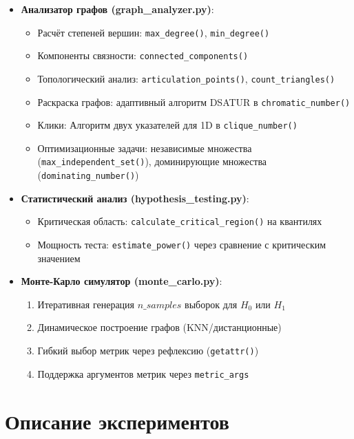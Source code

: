 \documentclass[a4paper, 12pt]{article}
\begin{document}
\begin{itemize}
    \item \textbf{Анализатор графов (graph\_analyzer.py)}:
    \begin{itemize}
            \item Расчёт степеней вершин: \texttt{max\_degree()}, \texttt{min\_degree()}
            \item Компоненты связности: \texttt{connected\_components()}
            \item Топологический анализ: \texttt{articulation\_points()}, \texttt{count\_triangles()}
            \item Раскраска графов: адаптивный алгоритм DSATUR в \texttt{chromatic\_number()}
            \item Клики: Алгоритм двух указателей для 1D в \texttt{clique\_number()}
            \item Оптимизационные задачи: независимые множества (\texttt{max\_independent\_set()}), доминирующие множества (\texttt{dominating\_number()})
        \end{itemize}
    
    \item \textbf{Статистический анализ (hypothesis\_testing.py)}:
    \begin{itemize}
        \item Критическая область: \texttt{calculate\_critical\_region()} на квантилях
        \item Мощность теста: \texttt{estimate\_power()} через сравнение с критическим значением
    \end{itemize}
    
    \item \textbf{Монте-Карло симулятор (monte\_carlo.py)}:
    \begin{enumerate}
        \item Итеративная генерация \(n\_samples\) выборок для \(H_0\) или \(H_1\)
        \item Динамическое построение графов (KNN/дистанционные)
        \item Гибкий выбор метрик через рефлексию (\texttt{getattr()})
        \item Поддержка аргументов метрик через \texttt{metric\_args}
    \end{enumerate}
\end{itemize}

\section{Описание экспериментов}
\end{document}
